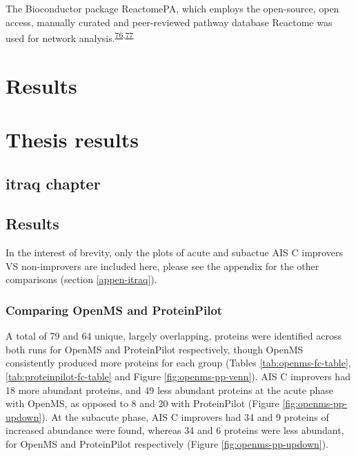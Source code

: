 \documentclass[
]{article}
\begin{document}
The Bioconductor package ReactomePA, which employs the open-source, open access, manually curated and peer-reviewed pathway database Reactome was used for network analysis.\textsuperscript{\protect\hyperlink{ref-yu_reactomepa_2016}{76},\protect\hyperlink{ref-jassal_reactome_2020}{77}}

\hypertarget{results}{%
\section{Results}\label{results}}

\hypertarget{thesis-results}{%
\section{Thesis results}\label{thesis-results}}

\hypertarget{itraq-chapter}{%
\subsection{itraq chapter}\label{itraq-chapter}}

\hypertarget{chap-3-results}{%
\subsection{Results}\label{chap-3-results}}

In the interest of brevity, only the plots of acute and subactue AIS C improvers VS non-improvers are included here, please see the appendix for the other comparisons (section \ref{appen-itraq}).

\hypertarget{comparing-openms-and-proteinpilot}{%
\subsubsection{Comparing OpenMS and ProteinPilot}\label{comparing-openms-and-proteinpilot}}

A total of 79 and 64 unique, largely overlapping, proteins were identified across both runs for OpenMS and ProteinPilot respectively, though OpenMS consistently produced more proteins for each group (Tables \ref{tab:openms-fc-table}, \ref{tab:proteinpilot-fc-table} and Figure \ref{fig:openms-pp-venn}).
AIS C improvers had 18 more abundant proteins, and 49 less abundant proteins at the acute phase with OpenMS, as opposed to 8 and 20 with ProteinPilot (Figure \ref{fig:openms-pp-updown}).
At the subacute phase, AIS C improvers had 34 and 9 proteins of increased abundance were found, whereas 34 and 6 proteins were less abundant, for OpenMS and ProteinPilot respectively (Figure \ref{fig:openms-pp-updown}).
\end{document}
